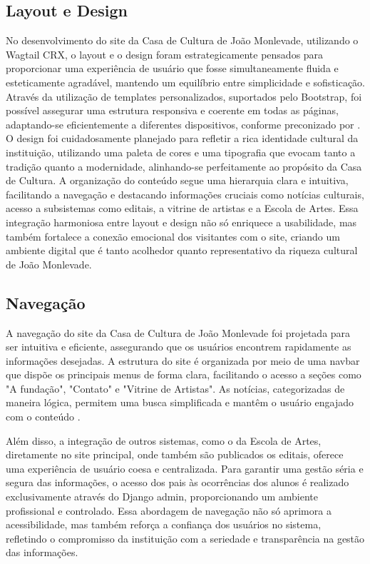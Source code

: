 \subsection{Layout e Design}

No desenvolvimento do site da Casa de Cultura de João Monlevade, utilizando o Wagtail CRX, o layout e o design foram estrategicamente pensados para proporcionar uma experiência de usuário que fosse simultaneamente fluida e esteticamente agradável, mantendo um equilíbrio entre simplicidade e sofisticação. Através da utilização de templates personalizados, suportados pelo Bootstrap, foi possível assegurar uma estrutura responsiva e coerente em todas as páginas, adaptando-se eficientemente a diferentes dispositivos, conforme preconizado por . O design foi cuidadosamente planejado para refletir a rica identidade cultural da instituição, utilizando uma paleta de cores e uma tipografia que evocam tanto a tradição quanto a modernidade, alinhando-se perfeitamente ao propósito da Casa de Cultura. A organização do conteúdo segue uma hierarquia clara e intuitiva, facilitando a navegação e destacando informações cruciais como notícias culturais, acesso a subsistemas como editais, a vitrine de artistas e a Escola de Artes. Essa integração harmoniosa entre layout e design não só enriquece a usabilidade, mas também fortalece a conexão emocional dos visitantes com o site, criando um ambiente digital que é tanto acolhedor quanto representativo da riqueza cultural de João Monlevade.

\subsection{Navegação}

A navegação do site da Casa de Cultura de João Monlevade foi projetada para ser intuitiva e eficiente, assegurando que os usuários encontrem rapidamente as informações desejadas. A estrutura do site é organizada por meio de uma navbar que dispõe os principais menus de forma clara, facilitando o acesso a seções como "A fundação", "Contato" e "Vitrine de Artistas". As notícias, categorizadas de maneira lógica, permitem uma busca simplificada e mantêm o usuário engajado com o conteúdo \cite{nielsen2012usability}. 

Além disso, a integração de outros sistemas, como o da Escola de Artes, diretamente no site principal, onde também são publicados os editais, oferece uma experiência de usuário coesa e centralizada. Para garantir uma gestão séria e segura das informações, o acesso dos pais às ocorrências dos alunos é realizado exclusivamente através do Django admin, proporcionando um ambiente profissional e controlado. Essa abordagem de navegação não só aprimora a acessibilidade, mas também reforça a confiança dos usuários no sistema, refletindo o compromisso da instituição com a seriedade e transparência na gestão das informações.

